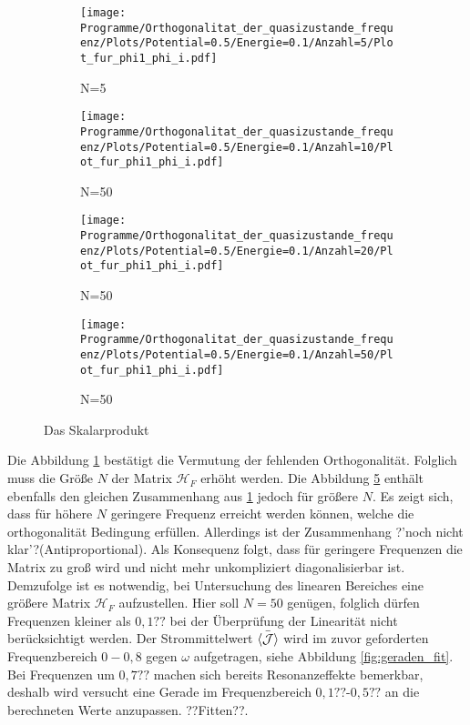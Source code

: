 \begin{figure}
   \centering
   \begin{subfigure}{0.48\textwidth}
       \texttt{[image: Programme/Orthogonalitat\_der\_quasizustande\_frequenz/Plots/Potential=0.5/Energie=0.1/Anzahl=5/Plot\_fur\_phi1\_phi\_i.pdf]}
       \caption{N=5}
       \label{fig:N_5}
     \end{subfigure}
     \begin{subfigure}{0.48\textwidth}
       \texttt{[image: Programme/Orthogonalitat\_der\_quasizustande\_frequenz/Plots/Potential=0.5/Energie=0.1/Anzahl=10/Plot\_fur\_phi1\_phi\_i.pdf]}
       \caption{N=50}
       \label{fig:N_10}
     \end{subfigure}
     \begin{subfigure}{0.48\textwidth}
       \texttt{[image: Programme/Orthogonalitat\_der\_quasizustande\_frequenz/Plots/Potential=0.5/Energie=0.1/Anzahl=20/Plot\_fur\_phi1\_phi\_i.pdf]}
       \caption{N=50}
       \label{fig:N_20}
     \end{subfigure}
     \begin{subfigure}{0.48\textwidth}
       \texttt{[image: Programme/Orthogonalitat\_der\_quasizustande\_frequenz/Plots/Potential=0.5/Energie=0.1/Anzahl=50/Plot\_fur\_phi1\_phi\_i.pdf]}
       \caption{N=50}
       \label{fig:N_50}
     \end{subfigure}
        \caption{Das Skalarprodukt }
    \label{fig:N_gross}
\end{figure}


Die Abbildung \ref{fig:N_5} bestätigt
die Vermutung der fehlenden Orthogonalität.
Folglich muss die Größe $N$ der Matrix
$\mathcal{H}_F$ erhöht werden.
Die Abbildung \ref{fig:N_gross} enthält ebenfalls
den gleichen Zusammenhang
aus \ref{fig:N_5} jedoch für
größere $N$.
Es zeigt sich, dass für höhere $N$ geringere Frequenz
erreicht werden können, welche die orthogonalität Bedingung
erfüllen. Allerdings
ist der Zusammenhang ?'noch nicht klar'?(Antiproportional).
Als Konsequenz folgt, dass für geringere
Frequenzen die Matrix zu groß wird und nicht
mehr unkompliziert diagonalisierbar ist.
Demzufolge ist es notwendig, bei Untersuchung des linearen Bereiches eine
größere Matrix $\mathcal{H}_F$ aufzustellen. Hier soll $N=50$ genügen,
folglich dürfen Frequenzen kleiner als $0,1??$ bei der Überprüfung der Linearität nicht
berücksichtigt werden.
Der Strommittelwert $\bar{\braket{\mathcal{J}}}$
 wird im zuvor geforderten Frequenzbereich $0-0,8$
gegen $\omega$ aufgetragen, siehe Abbildung \ref{fig:geraden_fit}.
Bei Frequenzen um $0,7??$
machen sich bereits Resonanzeffekte bemerkbar,
deshalb wird versucht eine Gerade im Frequenzbereich $0,1??$-$0,5??$
an die berechneten Werte anzupassen. ??Fitten??.

